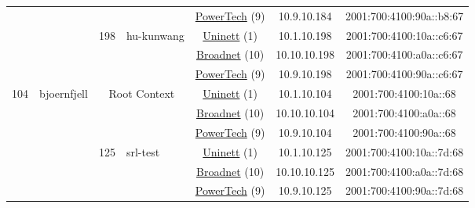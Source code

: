 \begin{small}
\begin{center}
\begin{longtable}{|c|c|c|c|c|c|c|c|}
  &  &  &  & \multicolumn{2}{|c|}{\tiny{\href{http://www.powertech.no}{PowerTech} (9)}} & \tiny{10.9.10.184} & \tiny{2001:700:4100:90a::b8:67} \\* \cline{3-3}\cline{4-4}\cline{5-5}\cline{6-6}\cline{7-7}\cline{8-8}
  &  & \multirow{3}{*}{\tiny{198}} & \multicolumn{1}{|l|}{\multirow{3}{*}{\tiny{hu-kunwang}}} & \multicolumn{2}{|c|}{\tiny{\href{https://www.uninett.no}{Uninett} (1)}} & \tiny{10.1.10.198} & \tiny{2001:700:4100:10a::c6:67} \\* \cline{5-5}\cline{6-6}\cline{7-7}\cline{8-8}
  &  &  &  & \multicolumn{2}{|c|}{\tiny{\href{https://www.broadnet.no}{Broadnet} (10)}} & \tiny{10.10.10.198} & \tiny{2001:700:4100:a0a::c6:67} \\* \cline{5-5}\cline{6-6}\cline{7-7}\cline{8-8}
  &  &  &  & \multicolumn{2}{|c|}{\tiny{\href{http://www.powertech.no}{PowerTech} (9)}} & \tiny{10.9.10.198} & \tiny{2001:700:4100:90a::c6:67} \\ \hline
 \multirow{42}{*}{\tiny{104}} & \multicolumn{1}{|l|}{\multirow{42}{*}{\tiny{bjoernfjell}}} & \multicolumn{2}{|c|}{\multirow{3}{*}{\tiny{Root Context}}} & \multicolumn{2}{|c|}{\tiny{\href{https://www.uninett.no}{Uninett} (1)}} & \tiny{10.1.10.104} & \tiny{2001:700:4100:10a::68} \\* \cline{5-5}\cline{6-6}\cline{7-7}\cline{8-8}
  &  & \multicolumn{2}{|c|}{} & \multicolumn{2}{|c|}{\tiny{\href{https://www.broadnet.no}{Broadnet} (10)}} & \tiny{10.10.10.104} & \tiny{2001:700:4100:a0a::68} \\* \cline{5-5}\cline{6-6}\cline{7-7}\cline{8-8}
  &  & \multicolumn{2}{|c|}{} & \multicolumn{2}{|c|}{\tiny{\href{http://www.powertech.no}{PowerTech} (9)}} & \tiny{10.9.10.104} & \tiny{2001:700:4100:90a::68} \\* \cline{3-3}\cline{4-4}\cline{5-5}\cline{6-6}\cline{7-7}\cline{8-8}
  &  & \multirow{3}{*}{\tiny{125}} & \multicolumn{1}{|l|}{\multirow{3}{*}{\tiny{srl-test}}} & \multicolumn{2}{|c|}{\tiny{\href{https://www.uninett.no}{Uninett} (1)}} & \tiny{10.1.10.125} & \tiny{2001:700:4100:10a::7d:68} \\* \cline{5-5}\cline{6-6}\cline{7-7}\cline{8-8}
  &  &  &  & \multicolumn{2}{|c|}{\tiny{\href{https://www.broadnet.no}{Broadnet} (10)}} & \tiny{10.10.10.125} & \tiny{2001:700:4100:a0a::7d:68} \\* \cline{5-5}\cline{6-6}\cline{7-7}\cline{8-8}
  &  &  &  & \multicolumn{2}{|c|}{\tiny{\href{http://www.powertech.no}{PowerTech} (9)}} & \tiny{10.9.10.125} & \tiny{2001:700:4100:90a::7d:68} \\* \cline{3-3}\cline{4-4}\cline{5-5}\cline{6-6}\cline{7-7}\cline{8-8}

\end{longtable}
\end{center}
\end{small}

